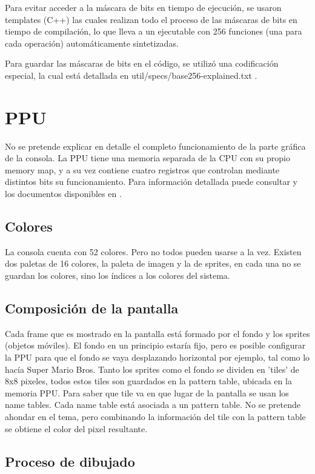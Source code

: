 Para evitar acceder a la máscara de bits en tiempo de ejecución, se usaron templates (C++) las cuales realizan todo el proceso de las máscaras de bits en tiempo de compilación, lo que lleva a un ejecutable con 256 funciones (una para cada operación) automáticamente sintetizadas.

Para guardar las máscaras de bits en el código, se utilizó una codificación especial, la cual está detallada en util/specs/base256-explained.txt .


\section{PPU}
No se pretende explicar en detalle el completo funcionamiento de la parte gráfica de la consola. La PPU tiene una memoria separada de la CPU con su propio memory map, y a su vez contiene cuatro registros que controlan mediante distintos bits su funcionamiento. Para información detallada puede consultar \cite[p.~16]{nesdoc} y los documentos disponibles en \cite{techdocs}.

\subsection{Colores}
La consola cuenta con 52 colores. Pero no todos pueden usarse a la vez. Existen dos paletas de 16 colores, la paleta de imagen y la de sprites, en cada una no se guardan los colores, sino los índices a los colores del sistema.

\subsection{Composición de la pantalla}
Cada frame que es mostrado en la pantalla está formado por el fondo y los sprites (objetos móviles). El fondo en un principio estaría fijo, pero es posible configurar la PPU para que el fondo se vaya desplazando horizontal por ejemplo, tal como lo hacía Super Mario Bros. Tanto los sprites como el fondo se dividen en 'tiles' de 8x8 pixeles, todos estos tiles son guardados en la pattern table, ubicada en la memoria PPU. Para saber que tile va en que lugar de la pantalla se usan los name tables. Cada name table está asociada a un pattern table. No se pretende ahondar en el tema, pero combinando la información del tile con la pattern table se obtiene el color del pixel resultante.

\subsection{Proceso de dibujado}

